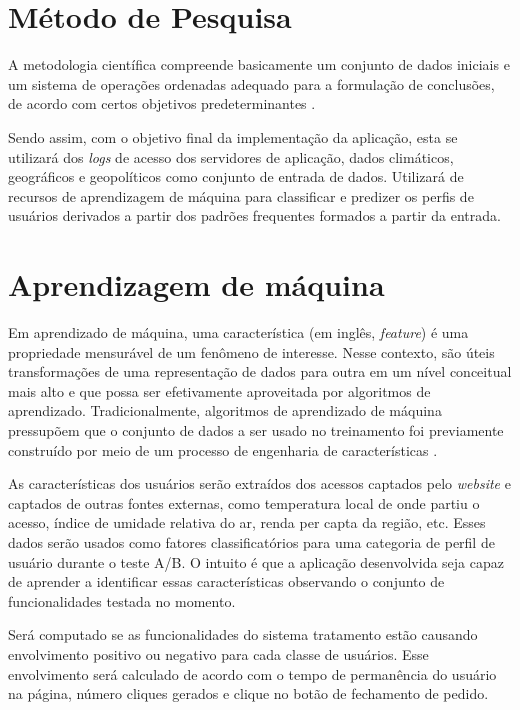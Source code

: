\documentclass[12pt]{article}
\begin{document}
\section{Método de Pesquisa}

A metodologia científica compreende basicamente um conjunto de dados iniciais e um sistema de operações ordenadas adequado para a formulação de conclusões, de acordo com certos objetivos predeterminantes \cite{tartuce:2006}.

Sendo assim, com o objetivo final da implementação da aplicação, esta se utilizará dos \textit{logs} de acesso dos servidores de aplicação, dados climáticos, geográficos e geopolíticos como conjunto de entrada de dados. Utilizará de recursos de aprendizagem de máquina para classificar e predizer os perfis de usuários derivados a partir dos padrões frequentes formados a partir da entrada.   

\section{Aprendizagem de máquina}

Em aprendizado de máquina, uma característica (em inglês, \textit{feature}) é uma propriedade mensurável de um fenômeno de interesse. Nesse contexto, são úteis transformações de uma representação de dados para outra em um nível conceitual mais alto e que possa ser efetivamente aproveitada por algoritmos de aprendizado. Tradicionalmente, algoritmos de aprendizado de máquina pressupõem que o conjunto de dados a ser usado no treinamento foi previamente construído por meio de um processo de engenharia de características \cite{bezerraintroduccao}.

As características dos usuários serão extraídos dos acessos captados pelo \textit{website} e captados de outras fontes externas, como temperatura local de onde partiu o acesso, índice de umidade relativa do ar, renda per capta da região, etc. Esses dados serão usados como fatores classificatórios para uma categoria de perfil de usuário durante o teste A/B. O intuito é que a aplicação desenvolvida seja capaz de aprender a identificar essas características observando o conjunto de funcionalidades testada no momento.

Será computado se as funcionalidades do sistema tratamento estão causando envolvimento positivo ou negativo para cada classe de usuários. Esse envolvimento será calculado de acordo com o tempo de permanência do usuário na página, número cliques gerados e clique no botão de fechamento de pedido.
\end{document}
